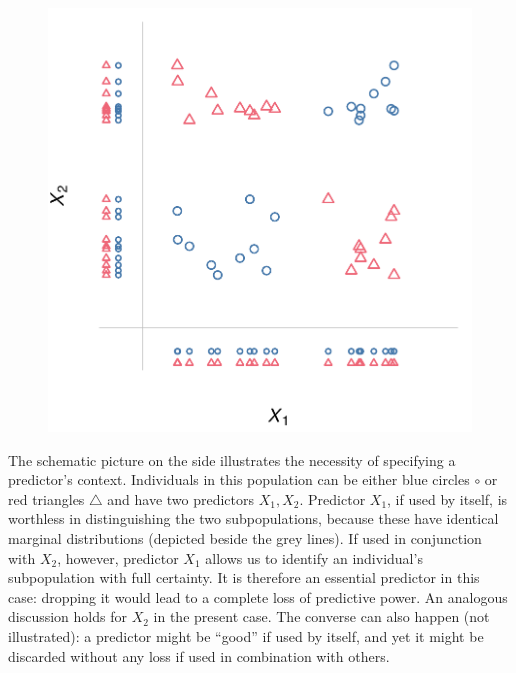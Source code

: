 \documentclass[utf8]{FrontiersinHarvard} %
\renewcommand*{\|}[1][]{\nonscript\:#1\vert\nonscript\:\mathopen{}}
\begin{document}
\setlength{\intextsep}{0ex}%
\setlength{\columnsep}{1ex}%
\begin{figure}%
\vspace{-1ex}%
\includegraphics[width=\linewidth]{example_importance_context3.pdf}%
\end{figure}%
The schematic picture on the side illustrates the necessity of specifying a predictor's context. Individuals in this population can be either \textcolor{bluepurple}{blue circles $\circ$} or \textcolor{redpurple}{red triangles $\triangle$} and have two predictors $X_{1}, X_{2}$. Predictor $X_{1}$, if used by itself, is worthless in distinguishing the two subpopulations, because these have identical marginal distributions (depicted beside the grey lines). If used in conjunction with $X_{2}$, however, predictor $X_{1}$ allows us to identify an individual's subpopulation with full certainty. It is therefore an essential predictor in this case: dropping it would lead to a complete loss of predictive power. An analogous discussion holds for $X_{2}$ in the present case. The converse can also happen (not illustrated): a predictor might be \enquote{good} if used by itself, and yet it might be discarded without any loss if used in combination with others.
\end{document}
